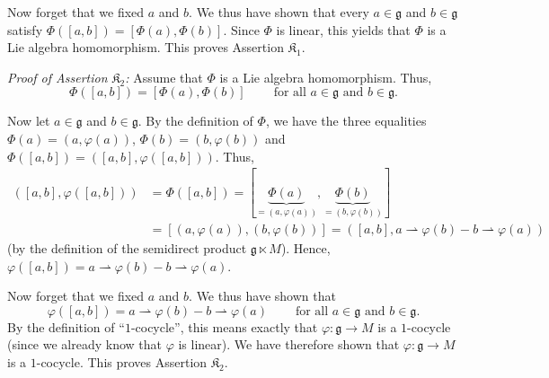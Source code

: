 \documentclass[etingof-lie.tex]{subfiles}
\begin{document}
\begin{verlong}
Now forget that we fixed $a$ and $b$. We thus have shown that every
$a\in\mathfrak{g}$ and $b\in\mathfrak{g}$ satisfy $\Phi\left(  \left[
a,b\right]  \right)  =\left[  \Phi\left(  a\right)  ,\Phi\left(  b\right)
\right]  $. Since $\Phi$ is linear, this yields that $\Phi$ is a Lie algebra
homomorphism. This proves Assertion $\mathfrak{K}_{1}$.

\textit{Proof of Assertion }$\mathfrak{K}_{2}$\textit{:} Assume that $\Phi$ is
a Lie algebra homomorphism. Thus,%
\[
\Phi\left(  \left[  a,b\right]  \right)  =\left[  \Phi\left(  a\right)
,\Phi\left(  b\right)  \right]  \ \ \ \ \ \ \ \ \ \ \text{for all }%
a\in\mathfrak{g}\text{ and }b\in\mathfrak{g}.
\]


Now let $a\in\mathfrak{g}$ and $b\in\mathfrak{g}$. By the definition of $\Phi
$, we have the three equalities $\Phi\left(  a\right)  =\left(  a,\varphi
\left(  a\right)  \right)  $, $\Phi\left(  b\right)  =\left(  b,\varphi\left(
b\right)  \right)  $ and $\Phi\left(  \left[  a,b\right]  \right)  =\left(
\left[  a,b\right]  ,\varphi\left(  \left[  a,b\right]  \right)  \right)  $.
Thus,%
\begin{align*}
\left(  \left[  a,b\right]  ,\varphi\left(  \left[  a,b\right]  \right)
\right)   &  =\Phi\left(  \left[  a,b\right]  \right)  =\left[
\underbrace{\Phi\left(  a\right)  }_{=\left(  a,\varphi\left(  a\right)
\right)  },\underbrace{\Phi\left(  b\right)  }_{=\left(  b,\varphi\left(
b\right)  \right)  }\right] \\
&  =\left[  \left(  a,\varphi\left(  a\right)  \right)  ,\left(
b,\varphi\left(  b\right)  \right)  \right]  =\left(  \left[  a,b\right]
,a\rightharpoonup\varphi\left(  b\right)  -b\rightharpoonup\varphi\left(
a\right)  \right)
\end{align*}
(by the definition of the semidirect product $\mathfrak{g}\ltimes M$). Hence,
$\varphi\left(  \left[  a,b\right]  \right)  =a\rightharpoonup\varphi\left(
b\right)  -b\rightharpoonup\varphi\left(  a\right)  $.

Now forget that we fixed $a$ and $b$. We thus have shown that%
\[
\varphi\left(  \left[  a,b\right]  \right)  =a\rightharpoonup\varphi\left(
b\right)  -b\rightharpoonup\varphi\left(  a\right)
\ \ \ \ \ \ \ \ \ \ \text{for all }a\in\mathfrak{g}\text{ and }b\in
\mathfrak{g}.
\]
By the definition of ``$1$-cocycle'', this means exactly that $\varphi
:\mathfrak{g}\rightarrow M$ is a $1$-cocycle (since we already know that
$\varphi$ is linear). We have therefore shown that $\varphi:\mathfrak{g}%
\rightarrow M$ is a $1$-cocycle. This proves Assertion $\mathfrak{K}_{2}$.


\end{verlong}
\end{document}
